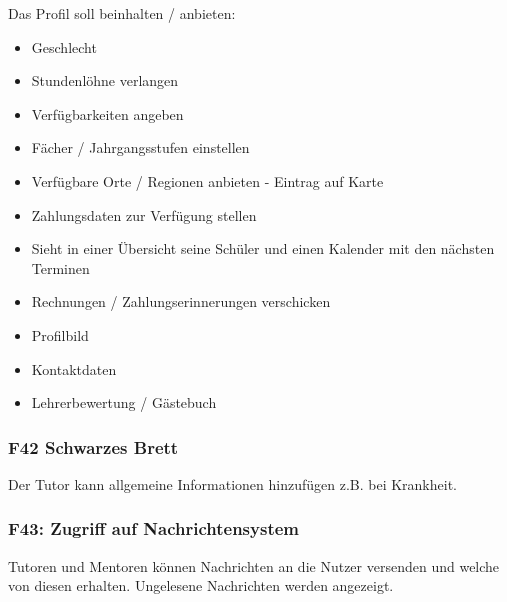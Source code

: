 \documentclass[10pt,a4paper]{scrartcl}
\begin{document}
Das Profil soll beinhalten / anbieten:
\begin{itemize}
	\item Geschlecht
	\item Stundenlöhne verlangen
	\item Verfügbarkeiten angeben
	\item Fächer / Jahrgangsstufen einstellen
	\item Verfügbare Orte / Regionen anbieten - Eintrag auf Karte
	\item Zahlungsdaten zur Verfügung stellen
	\item Sieht in einer Übersicht seine Schüler und einen Kalender mit den nächsten Terminen
	\item Rechnungen / Zahlungserinnerungen verschicken
	\item Profilbild
	\item Kontaktdaten
	\item Lehrerbewertung / Gästebuch
\end{itemize}

\subsubsection*{F42 Schwarzes Brett}

Der Tutor kann allgemeine Informationen hinzufügen z.B. bei Krankheit.

\subsubsection*{F43: Zugriff auf Nachrichtensystem}

Tutoren und Mentoren können Nachrichten an die Nutzer versenden und welche von diesen erhalten. Ungelesene Nachrichten werden angezeigt. 

% 
\end{document}
